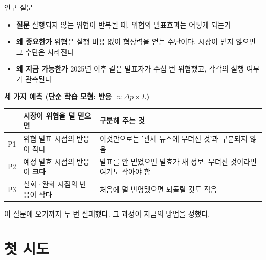 \documentclass[aspectratio=169,9pt,t]{beamer}
\newcommand{\takeaway}[1]{%
  \par\vfill
  \noindent{\color{navy}\vrule width 1.6pt}\hspace{2.6mm}%
  \begin{minipage}[c]{\dimexpr\linewidth-5mm\relax}\small\linespread{1.15}\selectfont\RaggedRight #1\end{minipage}\par\vspace{1.2mm}}
\newcommand{\lab}[1]{{\small\bfseries\color{navy}#1}}
\newcommand{\tf}{\fontsize{8.2}{10.4}\selectfont}
\begin{document}
\begin{frame}{연구 질문}
\begin{itemize}
\item \textbf{질문}\; 실행되지 않는 위협이 반복될 때, 위협의 발표효과는 어떻게 되는가
\item \textbf{왜 중요한가}\; 위협은 실행 비용 없이 협상력을 얻는 수단이다. 시장이 믿지 않으면 그 수단은 사라진다
\item \textbf{왜 지금 가능한가}\; 2025년 이후 같은 발표자가 수십 번 위협했고, 각각의 실행 여부가 관측된다
\end{itemize}
\vspace{1mm}
\lab{세 가지 예측 (단순 학습 모형: 반응 $\approx \Delta p \times L$)}\par\vspace{1mm}
\begingroup\tf
\begin{tabularx}{\textwidth}{@{}lL{0.38\textwidth}Y@{}}
\toprule
 & 시장이 위협을 덜 믿으면 & 구분해 주는 것\\
\midrule
P1 & 위협 발표 시점의 반응이 작다 & 이것만으로는 '관세 뉴스에 무뎌진 것'과 구분되지 않음\\
P2 & 예정 발효 시점의 반응이 \textbf{크다} & 발표를 안 믿었으면 발효가 새 정보. 무뎌진 것이라면 여기도 작아야 함\\
P3 & 철회·완화 시점의 반응이 작다 & 처음에 덜 반영됐으면 되돌릴 것도 적음\\
\bottomrule
\end{tabularx}\endgroup
\takeaway{이 질문에 오기까지 두 번 실패했다. 그 과정이 지금의 방법을 정했다.}
\end{frame}

\section{첫 시도}
\end{document}
